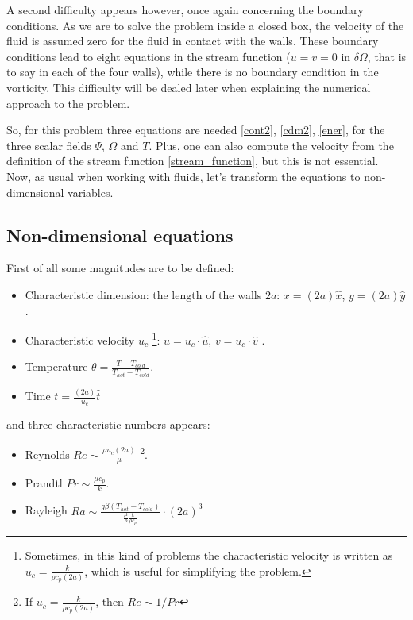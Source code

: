 A second difficulty appears however, once again concerning the boundary
conditions. As we are to solve the problem inside a closed box, the velocity of
the fluid is assumed zero for the fluid in contact with the walls. These
boundary conditions lead to eight equations in the stream function ($u=v=0$ in
$\delta \Omega$, that is to say in each of the four walls), while there is no
boundary condition in the vorticity. This difficulty will be dealed later when
explaining the numerical approach to the problem. \\

\vspace{1 cm}

So, for this problem three equations are needed \ref{cont2}, \ref{cdm2},
\ref{ener}, for the three scalar fields $\Psi$, $\Omega$ and $T$. Plus, one
can also compute the velocity from the definition of the stream function
\ref{stream_function}, but this is not essential. \\

Now, as usual when working with fluids, let's transform the equations to
non-dimensional variables. \\



\subsection{Non-dimensional equations}

First of all some magnitudes are to be defined: 

\begin{itemize}
  \item Characteristic dimension: the length of the walls $2a$: $x=(2a)\hat x$, 
  $y=(2a)\hat y$.
  \item Characteristic velocity $u_c$ \footnote{Sometimes, in this kind of problems the
  characteristic velocity is written as $u_c= \frac{k}{\rho c_p (2a)}$, which
  is useful for simplifying  the problem.}: $u= u_c \cdot \hat u$, $v=
  u_c \cdot \hat v$ .
  \item Temperature $\theta= \frac{T-T_{cold}}{T_{hot}-T_{cold}}$.
  \item Time $t= \frac{(2a)}{u_c} \hat t$
\end{itemize}

and three characteristic numbers appears: 

\begin{itemize}
  \item Reynolds $Re \sim \frac{\rho u_c (2a)}{\mu}$ \footnote{If $u_c=
  \frac{k}{\rho c_p (2a)}$, then $Re \sim 1/Pr$}.
  
  \item Prandtl $Pr \sim \frac{\mu c_p}{k}$.
  \item Rayleigh $Ra \sim \frac{g \beta (T_{hot}-T_{cold})}{\frac{\mu}{\rho}
  \frac{k}{\rho c_p}}\cdot (2a)^3$
\end{itemize}

